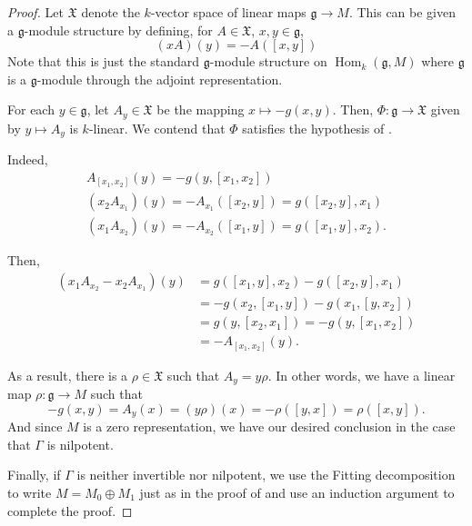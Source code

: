 \documentclass[12pt]{article}
\theoremstyle{thmstyle}
\theoremstyle{defstyle}
\newcommand{\Hom}{\operatorname{Hom}}
\newcommand{\frakg}{\mathfrak{g}}
\newcommand{\frakX}{\mathfrak{X}}
\begin{document}
\begin{proof}
    Let $\frakX$ denote the $k$-vector space of linear maps $\frakg\to M$. This can be given a $\frakg$-module structure by defining, for $A\in\frakX$, $x,y\in\frakg$, 
    \begin{equation*}
        (xA)(y) = - A([x, y])
    \end{equation*}
    Note that this is just the standard $\frakg$-module structure on $\Hom_k(\frakg, M)$ where $\frakg$ is a $\frakg$-module through the adjoint representation.

    For each $y\in\frakg$, let $A_y\in\frakX$ be the mapping $x\mapsto -g(x,y)$. Then, $\Phi:\frakg\to\frakX$ given by $y\mapsto A_y$ is $k$-linear. We contend that $\Phi$ satisfies the hypothesis of .

    Indeed, 
    \begin{align*}
        A_{[x_1, x_2]}(y) = -g(y, [x_1, x_2])\\
        (x_2A_{x_1})(y) = - A_{x_1}([x_2, y]) = g([x_2, y], x_1)\\
        (x_1A_{x_2})(y) = - A_{x_2}([x_1, y]) = g([x_1, y], x_2).
    \end{align*}

    Then, 
    \begin{align*}
        \left(x_1 A_{x_2} - x_2 A_{x_1}\right)(y) &= g([x_1, y], x_2) - g([x_2, y], x_1) \\
        &= -g(x_2, [x_1, y]) - g(x_1, [y, x_2])\\
        &= g(y, [x_2, x_1]) = -g(y, [x_1, x_2])\\
        &= -A_{[x_1, x_2]}(y).
    \end{align*}

    As a result, there is a $\rho\in\frakX$ such that $A_y = y\rho$. In other words, we have a linear map $\rho:\frakg\to M$ such that 
    \begin{equation*}
        -g(x,y) = A_y(x) = (y\rho)(x) = - \rho([y, x]) = \rho([x, y]).
    \end{equation*}
    And since $M$ is a zero representation, we have our desired conclusion in the case that $\Gamma$ is nilpotent.


    Finally, if $\Gamma$ is neither invertible nor nilpotent, we use the Fitting decomposition to write $M = M_0\oplus M_1$ just as in the proof of  and use an induction argument to complete the proof.
\end{proof}
\end{document}
